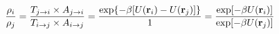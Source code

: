 \documentclass[12pt]{article}
\begin{document}
\begin{displaymath}
{{\rho_i}\over{\rho_j}} = 
{
{T_{j \rightarrow i} \times  A_{j \rightarrow i}}
\over
{T_{i \rightarrow j} \times  A_{i \rightarrow j} }
}
=
{
{\exp\{-\beta [U({\bf r}_i) - U({\bf r}_j)]\}}
\over
{1}
}
=
{
{\exp[-\beta U({\bf r}_i)]}
\over
{\exp[-\beta U({\bf r}_j)]}
}
\end{displaymath}
\end{document}
